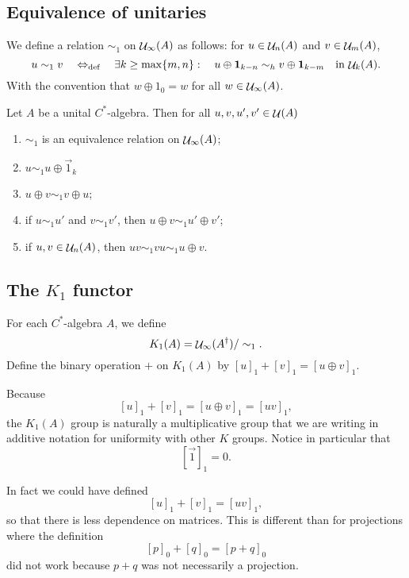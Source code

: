 \subsection{Equivalence of unitaries}
\begin{definition}
We define a relation $\sim_1$ on $\mathop{\mathcal{U}}\nolimits_\infty(A)$ as follows: for $u\in \mathop{\mathcal{U}}\nolimits_n(A)$ and $v\in \mathop{\mathcal{U}}\nolimits_m(A)$,
\[ u \sim_1 v \quad\Leftrightarrow_{\text{def}}\quad \exists k\geq \max\{m,n\}: \quad u\oplus \boldsymbol{\mathrm{1}}_{k-n} \sim_h v\oplus \boldsymbol{\mathrm{1}}_{k-m} \quad\text{in $\mathop{\mathcal{U}}\nolimits_{k}(A)$}. \]
With the convention that $w\oplus 1_0 = w$ for all $w\in\mathop{\mathcal{U}}\nolimits_\infty(A)$.
\end{definition}
\begin{lemma}
Let $A$ be a unital $C^*$-algebra. Then for all $u,v,u',v'\in \mathop{\mathcal{U}}\nolimits(A)$
\begin{enumerate}
\item $\sim_1$ is an equivalence relation on $\mathop{\mathcal{U}}\nolimits_\infty(A)$;
\item $u \sim_1 u\oplus \vec{1}_k$
\item $u\oplus v \sim_1 v\oplus u$;
\item if $u\sim_1 u'$ and $v\sim_1 v'$, then $u\oplus v \sim_1 u'\oplus v'$;
\item if $u,v\in \mathop{\mathcal{U}}\nolimits_n(A)$, then $uv\sim_1 vu \sim_1 u\oplus v$.
\end{enumerate}
\end{lemma}

\subsection{The $K_1$ functor}
\begin{definition}
For each $C^*$-algebra $A$, we define
\[ K_1(A) = \mathop{\mathcal{U}}\nolimits_\infty(A^\dagger) / \sim_1. \]
Define the binary operation $+$ on $K_1(A)$ by $[u]_1 + [v]_1 = [u\oplus v]_1$.
\end{definition}
Because
\[ [u]_1 + [v]_1 = [u\oplus v]_1 = [uv]_1, \]
the $K_1(A)$ group is naturally a multiplicative group that we are writing in additive notation for uniformity with other $K$ groups.
Notice in particular that
\[ [\vec{1}]_1 = 0. \]

In fact we could have defined
\[ [u]_1 + [v]_1 = [uv]_1, \]
so that there is less dependence on matrices. This is different than for projections where the definition
\[ [p]_0 + [q]_0 = [p+q]_0 \]
did not work because $p+q$ was not necessarily a projection.


